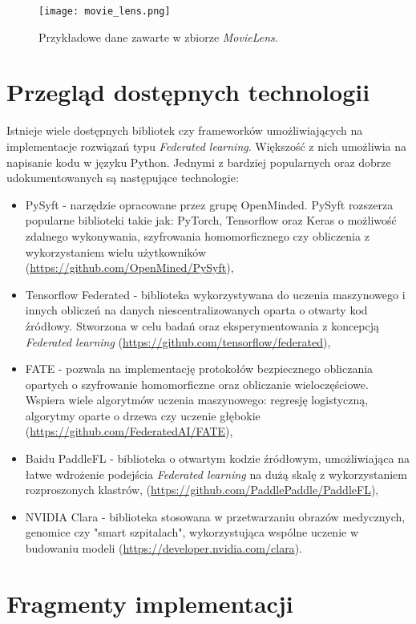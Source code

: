 \begin{figure}[h]
    \texttt{[image: movie\_lens.png]}
    \caption{Przykładowe dane zawarte w zbiorze \textit{MovieLens}.}
    \label{fig:movie_lens}
\end{figure}

\section{Przegląd dostępnych technologii}\label{technologie}

Istnieje wiele dostępnych bibliotek czy frameworków umożliwiających na implementacje rozwiązań typu \textit{Federated learning}. Większość z nich umożliwia na napisanie kodu w języku Python. Jednymi z bardziej popularnych oraz dobrze udokumentowanych są następujące technologie:

\begin{itemize}
    \item PySyft - narzędzie opracowane przez grupę OpenMinded. PySyft rozszerza popularne biblioteki takie jak: PyTorch, Tensorflow oraz Keras o możliwość zdalnego wykonywania, szyfrowania homomorficznego czy obliczenia z wykorzystaniem wielu użytkowników (\url{https://github.com/OpenMined/PySyft}),
    \item Tensorflow Federated - biblioteka wykorzystywana do uczenia maszynowego i innych obliczeń na danych niescentralizowanych oparta o otwarty kod źródłowy. Stworzona w celu badań oraz eksperymentowania z koncepcją \textit{Federated learning} (\url{https://github.com/tensorflow/federated}),
    \item FATE - pozwala na implementację protokołów bezpiecznego obliczania opartych o szyfrowanie homomorficzne oraz obliczanie wieloczęściowe. Wspiera wiele algorytmów uczenia maszynowego: regresję logistyczną, algorytmy oparte o drzewa czy uczenie głębokie (\url{https://github.com/FederatedAI/FATE}), 
    \item Baidu PaddleFL - biblioteka o otwartym kodzie źródłowym, umożliwiająca na łatwe wdrożenie podejścia \textit{Federated learning} na dużą skalę z wykorzystaniem rozproszonych klastrów, (\url{https://github.com/PaddlePaddle/PaddleFL}),
    \item NVIDIA Clara - biblioteka stosowana w przetwarzaniu obrazów medycznych, genomice czy "smart szpitalach", wykorzystująca wspólne uczenie w budowaniu modeli (\url{https://developer.nvidia.com/clara}).
\end{itemize}

\section{Fragmenty implementacji}

